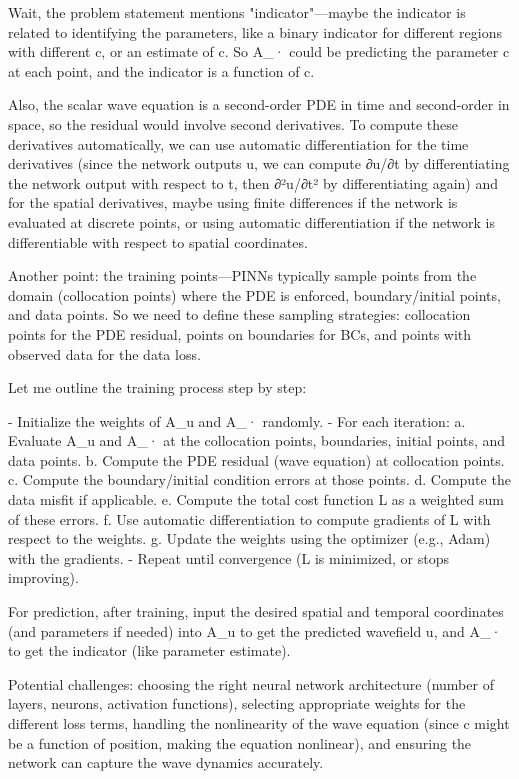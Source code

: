 Wait, the problem statement mentions "indicator"—maybe the indicator is related to identifying the parameters, like a binary indicator for different regions with different c, or an estimate of c. So A_· could be predicting the parameter c at each point, and the indicator is a function of c.

Also, the scalar wave equation is a second-order PDE in time and second-order in space, so the residual would involve second derivatives. To compute these derivatives automatically, we can use automatic differentiation for the time derivatives (since the network outputs u, we can compute ∂u/∂t by differentiating the network output with respect to t, then ∂²u/∂t² by differentiating again) and for the spatial derivatives, maybe using finite differences if the network is evaluated at discrete points, or using automatic differentiation if the network is differentiable with respect to spatial coordinates.

Another point: the training points—PINNs typically sample points from the domain (collocation points) where the PDE is enforced, boundary/initial points, and data points. So we need to define these sampling strategies: collocation points for the PDE residual, points on boundaries for BCs, and points with observed data for the data loss.

Let me outline the training process step by step:

- Initialize the weights of A_u and A_· randomly.
- For each iteration:
  a. Evaluate A_u and A_· at the collocation points, boundaries, initial points, and data points.
  b. Compute the PDE residual (wave equation) at collocation points.
  c. Compute the boundary/initial condition errors at those points.
  d. Compute the data misfit if applicable.
  e. Compute the total cost function L as a weighted sum of these errors.
  f. Use automatic differentiation to compute gradients of L with respect to the weights.
  g. Update the weights using the optimizer (e.g., Adam) with the gradients.
- Repeat until convergence (L is minimized, or stops improving).

For prediction, after training, input the desired spatial and temporal coordinates (and parameters if needed) into A_u to get the predicted wavefield u, and A_· to get the indicator (like parameter estimate).

Potential challenges: choosing the right neural network architecture (number of layers, neurons, activation functions), selecting appropriate weights for the different loss terms, handling the nonlinearity of the wave equation (since c might be a function of position, making the equation nonlinear), and ensuring the network can capture the wave dynamics accurately.

